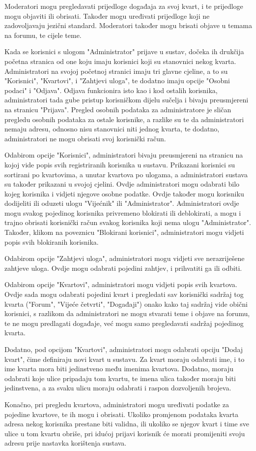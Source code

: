 	Moderatori mogu pregledavati prijedloge događaja za svoj kvart, i te prijedloge mogu objaviti ili obrisati. Također mogu uređivati prijedloge koji ne zadovoljavaju jezični standard. Moderatori također mogu brisati objave u temama na forumu, te cijele teme.
	
	Kada se korisnici s ulogom "Administrator" prijave u sustav, dočeka ih drukčija početna stranica od one koju imaju korisnici koji su stanovnici nekog kvarta. Administratori na svojoj početnoj stranici imaju tri glavne cjeline, a to su "Korisnici", "Kvartovi", i "Zahtjevi uloga", te dodatno imaju opcije "Osobni podaci" i "Odjava". Odjava funkcionira isto kao i kod ostalih korisnika, administratori tada gube pristup korisničkom dijelu sučelja i bivaju preusmjereni na stranicu "Prijava". Pregled osobnih podataka za administratore je sličan pregledu osobnih podataka za ostale korisnike, a razlike su te da administratori nemaju adresu, odnosno nisu stanovnici niti jednog kvarta, te dodatno, administratori ne mogu obrisati svoj korisnički račun.
	
	Odabirom opcije "Korisnici", administratori bivaju preusmjereni na stranicu na kojoj vide popis svih registriranih korisnika u sustavu. Prikazani korisnici su sortirani po kvartovima, a unutar kvartova po ulogama, a administratori sustava su također prikazani u svojoj cjelini. Ovdje administratori mogu odabrati bilo kojeg korisnika i vidjeti njegove osobne podatke. Ovdje također mogu korisniku dodijeliti ili oduzeti ulogu "Vijećnik" ili "Administrator". Administratori ovdje mogu svakog pojedinog korisnika privremeno blokirati ili deblokirati, a mogu i trajno obrisati korisnički račun svakog korisnika koji nema ulogu "Administrator". Također, klikom na poveznicu "Blokirani korisnici", administratori mogu vidjeti popis svih blokiranih korisnika.
	
	Odabirom opcije "Zahtjevi uloga", administratori mogu vidjeti sve nerazriješene zahtjeve uloga. Ovdje mogu odabrati pojedini zahtjev, i prihvatiti ga ili odbiti. 
	
	Odabirom opcije "Kvartovi", administratori mogu vidjeti popis svih kvartova. Ovdje sada mogu odabrati pojedini kvart i pregledati sav korisnički sadržaj tog kvarta ("Forum", "Vijeće četvrti", "Događaji") onako kako taj sadržaj vide obični korisnici, s razlikom da administratori ne mogu stvarati teme i objave na forumu, te ne mogu predlagati događaje, već mogu samo pregledavati sadržaj pojedinog kvarta.
	
	Dodatno, pod opcijom "Kvartovi", administratori mogu odabrati opciju "Dodaj kvart", čime definiraju novi kvart u sustavu. Za kvart moraju odabrati ime, i to ime kvarta mora biti jedinstveno među imenima kvartova. Dodatno, moraju odabrati koje ulice pripadaju tom kvartu, te imena ulica također moraju biti jedinstvena, a za svaku ulicu moraju odabrati i raspon dozvoljenih brojeva.
	
	Konačno, pri pregledu kvartova, administratori mogu uređivati podatke za pojedine kvartove, te ih mogu i obrisati. Ukoliko promjenom podataka kvarta adresa nekog korisnika prestane biti validna, ili ukoliko se njegov kvart i time sve ulice u tom kvartu obriše, pri idućoj prijavi korisnik će morati promijeniti svoju adresu prije nastavka korištenja sustava. 